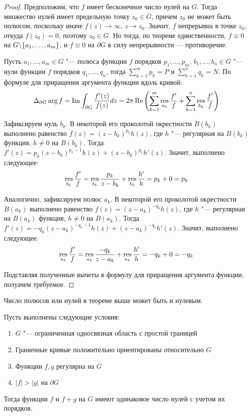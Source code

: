 \begin{proof}
	Предположим, что $f$ имеет бесконечное число нулей на $G$. Тогда множество нулей имеет предельную точку $z_0 \in \overline{G}$, причем $z_0$ не может быть полюсом, поскольку иначе $f(z) \to \infty$, $z \to z_0$. Значит, $f$ непрерывна в точке $z_0$, откуда $f(z_0) = 0$, поэтому $z_0 \in G$. Но тогда, по теореме единственности, $f \equiv 0$ на $G \backslash \{a_1, \dotsc, a_m\}$, и $f \equiv 0$ на $\partial G$ в силу непрерывности --- противоречие.
	
	Пусть $a_1, \dotsc, a_m \in G$ "--- полюса функции $f$ порядков $p_1, \dotsc, p_m$, $b_1, \dots, b_n \in G$ "--- нули функции $f$ порядков $q_1, \dotsc, q_n$, тогда $\sum_{k = 1}^mp_k = P$ и $\sum_{k = 1}^nq_k = N$. По формуле для приращения аргумента функции вдоль кривой:
	\[\Delta_{\partial G} \arg f = \operatorname{Im}\int_{\partial G}\frac{f'(z)}{f(z)}dz = 2\pi\operatorname{Re} \left(\sum_{k = 1}^m\operatorname*{res}_{a_k}\frac{f'}{f} + \sum_{k = 1}^n\operatorname*{res}_{b_k}\frac{f'}{f}\right)\]
	
	Зафиксируем нуль $b_k$. В некоторой его проколотой окрестности $\mathring B(b_k)$ выполнено равенство $f(z) = (z-b_k)^{p_k}h(z)$, где $h$ "--- регулярная на $B(b_k)$ функция, $h \ne 0$ на $B(b_k)$. Тогда $f'(z) = p_k(z-b_k)^{p_k - 1}h(z) + (z-b_k)^{p_k}h'(z)$. Значит, выполнено следующее:
	\[\operatorname*{res}_{b_k}\frac{f'}{f} = \operatorname*{res}_{b_k}\frac{p_k}{z-b_k} + \operatorname*{res}_{b_k}\frac{h'}{h} = p_k + 0 = p_k\]
	
	Аналогично, зафиксируем полюс $a_k$. В некоторой его проколотой окрестности $\mathring B(a_k)$ выполнено равенство $f(z) = (z-a_k)^{-q_k}h(z)$, где $h$ "--- регулярная на $B(a_k)$ функция, $h \ne 0$ на $B(a_k)$. Тогда $f'(z) = -q_k(z-a_k)^{-q_k - 1}h(z) + (z-a_k)^{-q_k}h'(z)$. Значит, выполнено следующее:
	\[\operatorname*{res}_{a_k}\frac{f'}{f} = \operatorname*{res}_{a_k}\frac{-q_k}{z-a_k} + \operatorname*{res}_{a_k}\frac{h'}{h} = -q_k + 0 = -q_k\]
	
	Подставляя полученные вычеты в формулу для приращения аргумента функции, полуачем требуемое.
\end{proof}

\begin{note}
	Число полюсов или нулей в теореме выше может быть и нулевым.
\end{note}

\begin{theorem}[Руше]
	Пусть выполнены следующие условия:
	\begin{enumerate}
		\item $G$ "--- ограниченная односвязная область с простой границей
		
		\item Граничные кривые положительно ориентированы относительно $G$
		
		\item Функции $f, g$ регулярна на $\overline{G}$
		
		\item $|f| > |g|$ на $\partial G$
	\end{enumerate}
	
	Тогда функции $f$ и $f+g$ на $G$ имеют одинаковое число нулей с учетом их порядков.
\end{theorem}

